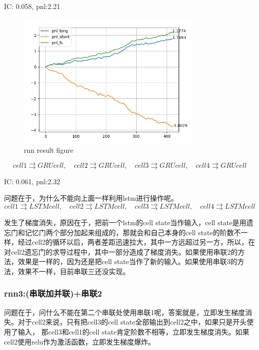 \documentclass[11pt]{ctexart}
\begin{document}
{\kaishu \small IC: 0.058, pnl:2.21}

\begin{figure}[H]
\begin{center}
\includegraphics[width=0.8\textwidth]{plt2.PNG}
\end{center}
\caption{rnn result figure}
\label{FIG.21}
\end{figure}

$$cell1 \rightrightarrows GRUcell, \quad cell2 \rightrightarrows GRUcell, \quad cell3 \rightrightarrows GRUcell, \quad cell4 \rightrightarrows GRUcell$$

{\kaishu \small IC: 0.061, pnl:2.32} 

问题在于，为什么不能向上面一样利用lstm进行操作呢。
$$cell1 \rightrightarrows LSTMcell, \quad cell2 \rightrightarrows LSTMcell, \quad cell3 \rightrightarrows LSTMcell, \quad cell4 \rightrightarrows LSTMcell$$

发生了梯度消失，原因在于，把前一个lstm的cell state当作输入，cell state是用遗忘门和记忆门两个部分加起来组成的，那就会和自己本身的cell state的阶数不一样，经过cell2的循环以后，两者差距迅速拉大，其中一方远超过另一方，所以，在对cell2遗忘门的求导过程中，其中一部分造成了梯度消失。如果使用串联2的方法，效果是一样的，因为还是把cell state当作了新的输入。如果使用串联3的方法，效果不一样，目前串联三还没实现。

\subsubsection{rnn3:(串联加并联)+串联2}
问题在于，问什么不能在第二个串联处使用串联1呢，答案就是，立即发生梯度消失。对于cell2来说，只有把cell3的cell state全部输出到cell2之中，如果只是开头使用了输入， 那cell3和cell1的cell state肯定阶数不相等，立即发生梯度消失。如果cell2使用relu作为激活函数，立即发生梯度爆炸。
\end{document}
